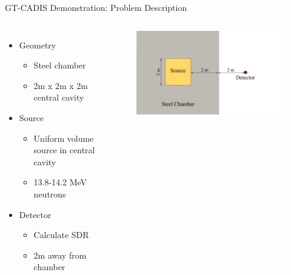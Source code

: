 \documentclass{beamer}
\begin{document}
\begin{frame}{GT-CADIS Demonstration: Problem Description}
	\begin{columns}
           \begin{itemize}
		   \item{Geometry}
			   \begin{itemize}
				   \item{Steel chamber}
				   \item{2m x 2m x 2m central cavity}
			   \end{itemize}
		   \item{Source}
			   \begin{itemize}
				   \item{Uniform volume source in central cavity}
				   \item{13.8-14.2 MeV neutrons}
			   \end{itemize}
		   \item{Detector}
			   \begin{itemize}
			   \item{Calculate SDR}
			   \item{2m away from chamber}
			   \end{itemize}
	   \end{itemize}
		\begin{figure}
		\centering
		\includegraphics[scale=0.40]{orig_geom_pres.png}
                \end{figure}
	\end{columns}
\end{frame}
\end{document}
